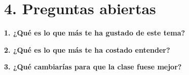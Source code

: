 \documentclass[12pt,a4paper]{article}
\begin{document}
\vspace{1.2em}

\section*{4. Preguntas abiertas}

\noindent\textbf{1. ¿Qué es lo que más te ha gustado de este tema?}

\vspace{0.3em}
\noindent\underline{\hspace{\textwidth}}

\vspace{0.6em}
\noindent\underline{\hspace{\textwidth}}

\vspace{1em}
\noindent\textbf{2. ¿Qué es lo que más te ha costado entender?}

\vspace{0.3em}
\noindent\underline{\hspace{\textwidth}}

\vspace{0.6em}
\noindent\underline{\hspace{\textwidth}}

\vspace{1em}
\noindent\textbf{3. ¿Qué cambiarías para que la clase fuese mejor?}

\vspace{0.3em}
\noindent\underline{\hspace{\textwidth}}

\vspace{0.6em}
\noindent\underline{\hspace{\textwidth}}
\end{document}
